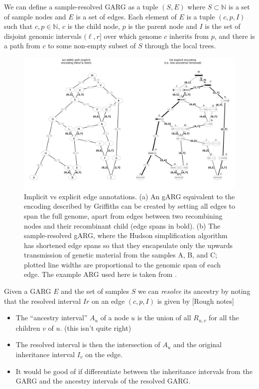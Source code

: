 \documentclass{article}
\begin{document}
We can define a sample-resolved GARG as a tuple $(S, E)$
where $S \subset \mathbb{N}$ is a set of sample nodes and
$E$ is a set of edges. Each element of $E$
is a tuple $(c, p, I)$ such that $c, p \in \mathbb{N}$,
$c$ is the child node, $p$ is the parent node and $I$ is the set of
disjoint genomic intervals $(\ell, r]$
over which genome $c$ inherits from $p$, and there is a path from
$c$ to some non-empty subset of $S$ through the local trees.


\begin{figure}
\centering
\includegraphics[width=\textwidth]{illustrations/ARG_edge_annotations}
\caption{\label{fig-ancestry-resolution}
Implicit vs explicit edge annotations. (a) An gARG equivalent to the encoding
described by Griffiths can be created by setting all edges to span the full
genome, apart from edges between two recombining nodes and their recombinant
child (edge spans in bold). (b) The sample-resolved gARG, where the Hudson
simplification algorithm has shortened edge spans so that they encapsulate only
the upwards transmission of genetic material from the samples A, B, and C;
plotted line widths are proportional to the genomic span of each edge. The
example ARG used here is taken from \citet[][fig. 1]{wiuf1999recombination}.
}
\end{figure}

Given a GARG $E$ and the set of samples $S$ we can \emph{resolve} its
ancestry by noting that the resolved interval $Ir$ on an edge $(c,p,I)$
is given by [Rough notes]

\begin{itemize}
\item The ``ancestry interval'' $A_u$ of a node $u$ is the union of
all $R_{u, v}$ for all the children $v$ of $u$. (this isn't quite right)
\item The resolved interval is then the intersection of $A_u$ and the
original inheritance interval $I_v$ on the edge.
\item It would be good of if differentiate between the inheritance intervals
 from the GARG and the ancestry intervals of the resolved GARG.
\end{itemize}
\end{document}
